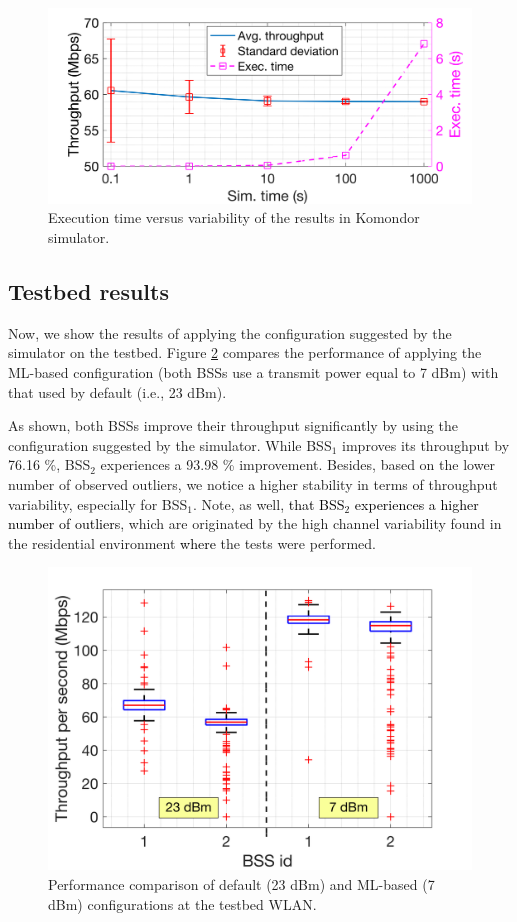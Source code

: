 \documentclass[journal]{IEEEtran}
\begin{document}
	\begin{figure}[ht!]
		\centering
		\includegraphics[width=0.9\columnwidth]{test_sim_time_vs_accuracy.png}
		\caption{Execution time versus variability of the results in Komondor simulator.}
		\label{fig:test_sim_time_vs_accuracy}
	\end{figure}

	\subsection{Testbed results}
	Now, we show the results of applying the configuration suggested by the simulator on the testbed. Figure \ref{fig:results} compares the performance of applying the ML-based configuration (both BSSs use a transmit power equal to 7 dBm) with that used by default (i.e., 23 dBm).
	
	As shown, both BSSs improve their throughput significantly by using the configuration suggested by the simulator. While BSS$_1$ improves its throughput by 76.16 \%, BSS$_2$ experiences a 93.98 \% improvement. Besides, based on the lower number of observed outliers, we notice \textcolor{black}{a} higher stability in terms of throughput variability, especially for BSS$_1$. Note, as well, \textcolor{black}{that BSS$_2$ experiences a higher number of outliers}, which are originated by the high channel variability found in the residential environment \textcolor{black}{where} the tests were performed.
	\begin{figure}[ht!!!!]
		\centering
		\includegraphics[width=0.8\columnwidth]{boxplotbps.png}
		\caption{Performance comparison of default (23 dBm) and ML-based (7 dBm) configurations at the testbed WLAN.}
		\label{fig:results}
	\end{figure}
	
\end{document}
